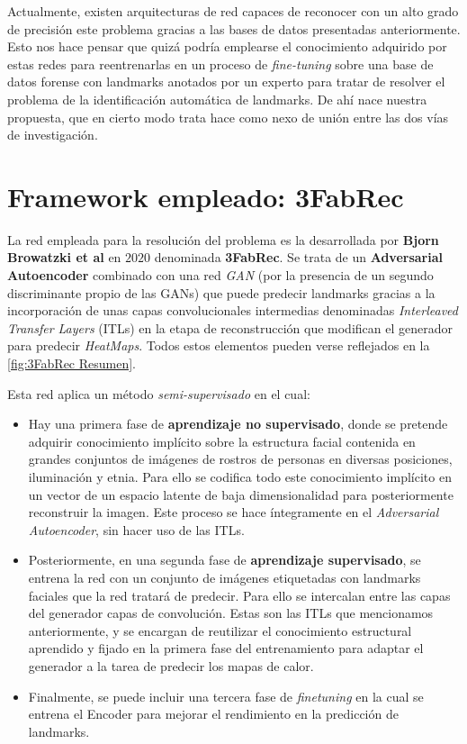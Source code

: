     \medskip

    \noindent Actualmente, existen arquitecturas de red capaces de reconocer con un alto grado de precisión este problema gracias a las bases de datos presentadas anteriormente. Esto nos hace pensar que quizá podría emplearse el conocimiento adquirido por estas redes para reentrenarlas en un proceso de \textit{fine-tuning} sobre una base de datos forense con landmarks anotados por un experto para tratar de resolver el problema de la identificación automática de landmarks. De ahí nace nuestra propuesta, que en cierto modo trata hace como nexo de unión entre las dos vías de investigación. 


\section{Framework empleado: 3FabRec }
        \noindent La red empleada para la resolución del problema es la desarrollada por \textbf{Bjorn Browatzki et al} en $2020$ \cite{browatzki20203fabrec} denominada \textbf{3FabRec}. Se trata de un \textbf{Adversarial Autoencoder} combinado con una red \textit{GAN} (por la presencia de un segundo discriminante propio de las GANs) que puede predecir landmarks gracias a la incorporación de unas capas convolucionales intermedias denominadas \textit{Interleaved Transfer Layers} (ITLs) en la etapa de reconstrucción que modifican el generador para predecir \textit{HeatMaps}. Todos estos elementos pueden verse reflejados en la \autoref{fig:3FabRec Resumen}.      

        \medskip

        \noindent Esta red aplica un método \textit{semi-supervisado} \cite{zhu2009introduction} en el cual:

        \begin{itemize}
            \item Hay una primera fase de \textbf{aprendizaje no supervisado}, donde se pretende adquirir conocimiento implícito sobre la estructura facial contenida en grandes conjuntos de imágenes de rostros de personas en diversas posiciones, iluminación y etnia. Para ello se codifica todo este conocimiento implícito en un vector de un espacio latente de baja dimensionalidad para posteriormente reconstruir la imagen. Este proceso se hace íntegramente en el \textit{Adversarial Autoencoder}, sin hacer uso de las ITLs.
            \item Posteriormente, en una segunda fase de \textbf{aprendizaje supervisado}, se entrena la red con un conjunto de imágenes etiquetadas con landmarks faciales que la red tratará de predecir. Para ello se intercalan entre las capas del generador capas de convolución. Estas son las ITLs que mencionamos anteriormente, y se encargan de reutilizar el conocimiento estructural aprendido y fijado en la primera fase del entrenamiento para adaptar el generador a la tarea de predecir los mapas de calor.
            \item Finalmente, se puede incluir una tercera fase de \textit{finetuning} en la cual se entrena el Encoder para mejorar el rendimiento en la predicción de landmarks.
        \end{itemize} 


